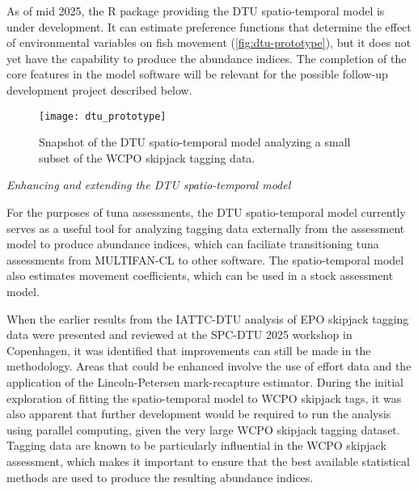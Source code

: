\documentclass{SCreport}
\begin{document}
As of mid 2025, the R package providing the DTU spatio-temporal model is under
development. It can estimate preference functions that determine the effect of
environmental variables on fish movement (\autoref{fig:dtu-prototype}), but it
does not yet have the capability to produce the abundance indices. The
completion of the core features in the model software will be relevant for the
possible follow-up development project described below.

\begin{figure}
  \centering
  \texttt{[image: dtu\_prototype]}
  \caption{Snapshot of the DTU spatio-temporal model analyzing a small subset of
    the WCPO skipjack tagging data.\label{fig:dtu-prototype}}
\end{figure}

\vspace{2ex}

\textit{Enhancing and extending the DTU spatio-temporal model}

For the purposes of tuna assessments, the DTU spatio-temporal model currently
serves as a useful tool for analyzing tagging data externally from the
assessment model to produce abundance indices, which can faciliate transitioning
tuna assessments from MULTIFAN-CL to other software. The spatio-temporal model
also estimates movement coefficients, which can be used in a stock assessment
model.

When the earlier results from the IATTC-DTU analysis of EPO skipjack tagging
data were presented and reviewed at the SPC-DTU 2025 workshop in Copenhagen, it
was identified that improvements can still be made in the methodology. Areas
that could be enhanced involve the use of effort data and the application of the
Lincoln-Petersen mark-recapture estimator. During the initial exploration of
fitting the spatio-temporal model to WCPO skipjack tags, it was also apparent
that further development would be required to run the analysis using parallel
computing, given the very large WCPO skipjack tagging dataset. Tagging data are
known to be particularly influential in the WCPO skipjack assessment, which
makes it important to ensure that the best available statistical methods are
used to produce the resulting abundance indices.
\end{document}
